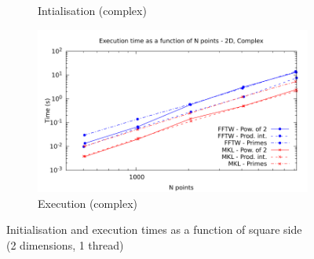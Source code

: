 \documentclass[12pt, a4paper]{article}
\begin{document}
\begin{figure}[H]
\begin{subfigure}{.5\textwidth}
\caption{Intialisation (complex)}
\label{2DCI}
\end{subfigure}%
\begin{subfigure}{.5\textwidth}
\centering
\includegraphics[width=.9\linewidth]{graphs/2d-exec-c.pdf}
\caption{Execution (complex)}
\label{2DC}
\end{subfigure}
\caption{Initialisation and execution times as a function of square side\\(2 dimensions, 1 thread)}
\label{2D}
\end{figure}
\end{document}
